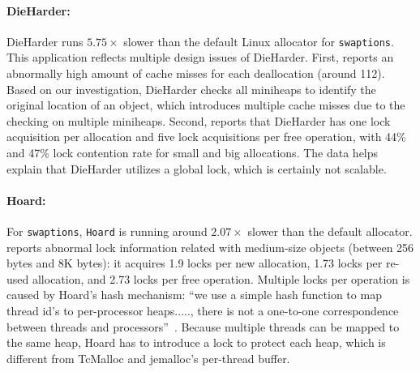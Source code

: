 
\paragraph{DieHarder:} DieHarder runs $5.75\times$ slower than the default Linux allocator for \texttt{swaptions}. This application reflects multiple design issues of DieHarder. First, \MP{} reports an abnormally high amount of cache misses for each deallocation (around 112). Based on our investigation, DieHarder checks all miniheaps to identify the original location of an object, which introduces multiple cache misses due to the checking on multiple miniheaps. Second, \MP{} reports that DieHarder has one lock acquisition per allocation and five lock acquisitions per free operation, with 44\%  and 47\% lock contention rate for small and big allocations. The data helps explain that  DieHarder utilizes a global lock, which is certainly not scalable.  



\paragraph{Hoard:} 
For \texttt{swaptions}, \texttt{Hoard} is running around $2.07\times$ slower than the default allocator. \MP{} reports abnormal lock information related with medium-size objects (between 256 bytes and 8K bytes): it acquires 1.9 locks per new allocation, 1.73 locks per re-used allocation, and 2.73 locks per free operation. 
Multiple locks per operation is caused by Hoard's hash mechanism: ``we use a simple hash function to map thread id’s to per-processor heaps....., there is not a one-to-one correspondence between threads and processors''~\cite{Hoard}. Because multiple threads can be mapped to the same heap, Hoard has to introduce a lock to protect each heap, which is different from TcMalloc and jemalloc's per-thread buffer. 

